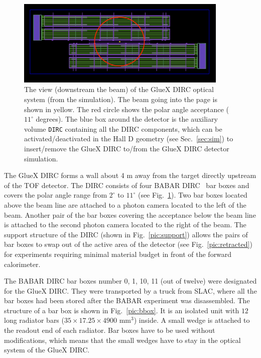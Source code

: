 \documentclass[11pt, a4paper]{article}
\begin{document}
\begin{figure}[!htb]
\centering
\includegraphics[width=0.9\textwidth]{pics/sim1.png}
\caption{\label{pic:sim}
The view (downstream the beam) of the GlueX DIRC optical system (from the simulation). The beam going into the page is shown in yellow. The red circle shows the polar angle acceptance ($11^{\circ}$ degrees).
The blue box around the detector is the auxiliary volume \texttt{DIRC} containing all the DIRC components, which can be activated/deactivated in the Hall D geometry (see Sec.~\ref{sec:sim}) to insert/remove the GlueX DIRC to/from the GlueX DIRC detector simulation.}
\end{figure}

The GlueX DIRC forms a wall about 4 m away from the target directly upstream of the TOF detector. The DIRC consists of four BABAR DIRC~\cite{bdirc1} bar boxes and covers the polar angle range from $2^{\circ}$ to $11^{\circ}$ (see Fig.~\ref{pic:sim}). Two bar boxes located above the beam line are attached to a photon camera located to the left of the beam. Another pair of the bar boxes covering the acceptance below the beam line is attached to the second photon camera located to the right of the beam. The support structure of the DIRC (shown in Fig.~\ref{pic:support}) allows the pairs of bar boxes to swap out of the active area of the detector (see Fig.~\ref{pic:retracted}) for experiments requiring minimal material budget in front of the forward calorimeter.

The BABAR DIRC bar boxes number 0, 1, 10, 11 (out of twelve) were designated for the GlueX DIRC. They were transported by a truck from SLAC, where all the bar boxes had been stored after the BABAR experiment was disassembled. The structure of a bar box is shown in Fig.~\ref{pic:bbox}. It is an isolated unit with $12$ long radiator bars ($35 \times 17.25 \times 4900 $ mm$^3$) inside. A small wedge is attached to the readout end of each radiator. Bar boxes have to be used without modifications, which means that the small wedges have to stay in the optical system of the GlueX DIRC.
\end{document}

